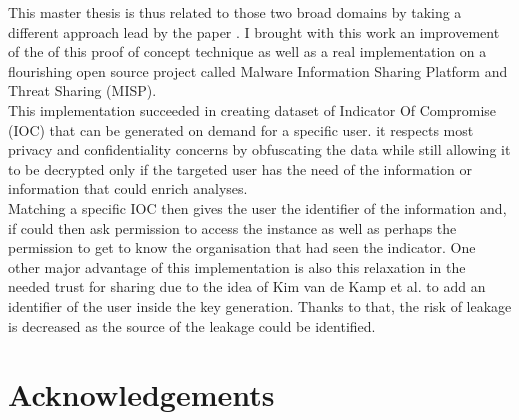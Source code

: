 \documentclass{eplmastersthesis}
\begin{document}
This master thesis is thus related to those two broad domains by taking a different approach lead by the paper \cite{van2016private}. I brought with this work an improvement of the of this proof of concept technique as well as a real implementation on a flourishing open source project called Malware Information Sharing Platform and Threat Sharing (MISP).\\
This implementation succeeded in creating dataset of Indicator Of Compromise (IOC) that can be generated on demand for a specific user. it respects most privacy and confidentiality concerns by obfuscating the data while still allowing it to be decrypted only if the targeted user has the need of the information or information that could enrich analyses.\\
Matching a specific IOC then gives the user the identifier of the information and, if could then ask permission to access the instance as well as perhaps the permission to get to know the organisation that had seen the indicator.
One other major advantage of this implementation is also this relaxation in the needed trust for sharing due to the idea of Kim van de Kamp et al. to add an identifier of the user inside the key generation. Thanks to that, the risk of leakage is decreased as the source of the leakage could be identified.\\



\section{Acknowledgements}

\newpage


\newpage

\backcoverpage
\end{document}
